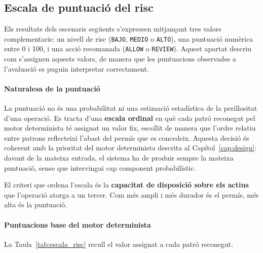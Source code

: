 \subsection{Escala de puntuació del risc}
\label{sec:escala_risc}

Els resultats dels escenaris següents s'expressen mitjançant tres valors complementaris: un nivell de risc (\texttt{BAJO}, \texttt{MEDIO} o \texttt{ALTO}), una puntuació numèrica entre 0 i 100, i una acció recomanada (\texttt{ALLOW} o \texttt{REVIEW}). Aquest apartat descriu com s'assignen aquests valors, de manera que les puntuacions observades a l'avaluació es puguin interpretar correctament.

\paragraph{Naturalesa de la puntuació}

La puntuació no és una probabilitat ni una estimació estadística de la perillositat d'una operació. Es tracta d'una \textbf{escala ordinal} en què cada patró reconegut pel motor determinista té assignat un valor fix, escollit de manera que l'ordre relatiu entre patrons reflecteixi l'abast del permís que es concedeix. Aquesta decisió és coherent amb la prioritat del motor determinista descrita al Capítol~\ref{cap:design}: davant de la mateixa entrada, el sistema ha de produir sempre la mateixa puntuació, sense que intervingui cap component probabilístic.

El criteri que ordena l'escala és la \textbf{capacitat de disposició sobre els actius} que l'operació atorga a un tercer. Com més ampli i més durador és el permís, més alta és la puntuació.

\paragraph{Puntuacions base del motor determinista}

La Taula~\ref{tab:escala_risc} recull el valor assignat a cada patró reconegut.

